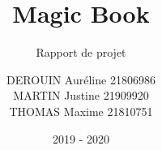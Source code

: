 \documentclass[report]{BetterDocument}
\title{Magic Book}
\subtitle{Rapport de projet}
\author{DEROUIN Auréline 21806986\\
	MARTIN Justine 21909920\\
	THOMAS Maxime 21810751
}
\date{2019 - 2020}
\institute{Unicaen}
\begin{document}
	\pageDeGarde

	\tableDesMatieres

	

	

	

	

	

	
\end{document}
